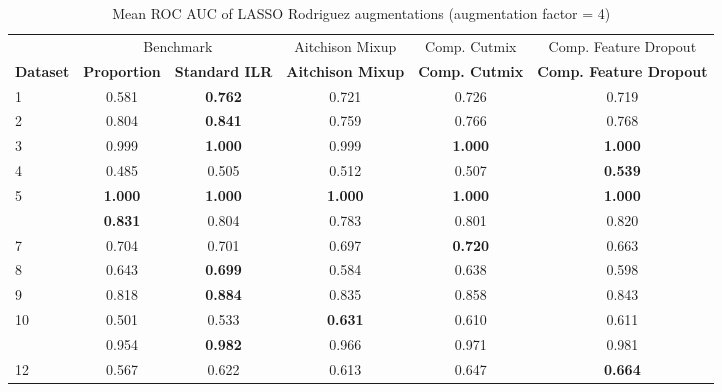 \begin{table}[!h]
\centering
\caption{\label{tab:tab:rodriguez_lasso_mean_roc_auc_4}Mean ROC AUC of LASSO Rodriguez augmentations (augmentation factor = 4)}
\centering
\begin{tabular}[t]{lccccc}
\toprule
\multicolumn{1}{c}{ } & \multicolumn{2}{c}{Benchmark} & \multicolumn{1}{c}{Aitchison Mixup} & \multicolumn{1}{c}{Comp. Cutmix} & \multicolumn{1}{c}{Comp. Feature Dropout} \\
\cmidrule(l{3pt}r{3pt}){2-3} \cmidrule(l{3pt}r{3pt}){4-4} \cmidrule(l{3pt}r{3pt}){5-5} \cmidrule(l{3pt}r{3pt}){6-6}
\textbf{Dataset} & \textbf{Proportion} & \textbf{Standard ILR} & \textbf{Aitchison Mixup} & \textbf{Comp. Cutmix} & \textbf{Comp. Feature Dropout}\\
\midrule
1 & 0.581 & \textbf{0.762} & 0.721 & 0.726 & 0.719\\
2 & 0.804 & \textbf{0.841} & 0.759 & 0.766 & 0.768\\
3 & 0.999 & \textbf{1.000} & 0.999 & \textbf{1.000} & \textbf{1.000}\\
4 & 0.485 & 0.505 & 0.512 & 0.507 & \textbf{0.539}\\
5 & \textbf{1.000} & \textbf{1.000} & \textbf{1.000} & \textbf{1.000} & \textbf{1.000}\\
\addlinespace
6 & \textbf{0.831} & 0.804 & 0.783 & 0.801 & 0.820\\
7 & 0.704 & 0.701 & 0.697 & \textbf{0.720} & 0.663\\
8 & 0.643 & \textbf{0.699} & 0.584 & 0.638 & 0.598\\
9 & 0.818 & \textbf{0.884} & 0.835 & 0.858 & 0.843\\
10 & 0.501 & 0.533 & \textbf{0.631} & 0.610 & 0.611\\
\addlinespace
11 & 0.954 & \textbf{0.982} & 0.966 & 0.971 & 0.981\\
12 & 0.567 & 0.622 & 0.613 & 0.647 & \textbf{0.664}\\
\bottomrule
\end{tabular}
\end{table}
